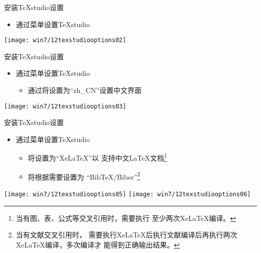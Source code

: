 \documentclass[fontset = none, t]{ctexbeamer}
\begin{document}
\begin{frame}{安装TeXstudio}{设置}
  \begin{spacing}{1.5}
    \begin{itemize}
    \item 通过菜单设置TeXstudio%
    \end{itemize}
    \begin{center}
      \texttt{[image: win7/12texstudiooptions02]}
    \end{center}
  \end{spacing}
\end{frame}

\begin{frame}{安装TeXstudio}{设置}
  \begin{spacing}{1.5}
    \begin{itemize}
    \item 通过菜单设置TeXstudio%
      \begin{itemize}
      \item 通过将设置为\enquote{zh\_CN}设置中文界面
      \end{itemize}
    \end{itemize}
    \begin{center}
      \texttt{[image: win7/12texstudiooptions03]}
    \end{center}
  \end{spacing}
\end{frame}

\begin{frame}{安装TeXstudio}{设置}
  \begin{spacing}{1.5}
    \begin{itemize}
    \item 通过菜单设置TeXstudio%
      \begin{itemize}
      \item 将设置为\alert{\enquote{XeLaTeX}}以
        支持中文\LaTeX 文档\footnote[frame,1]{当有图、表、公式等交叉引用时，需要执行
          至少两次XeLaTeX编译。}
      \item 将根据需要设置为
        \enquote{BibTeX/Biber}\footnote[frame,2]{当有文献交叉引用时，
          需要执行XeLaTeX后执行文献编译后再执行两次XeLaTeX编译，多次编译才
          能得到正确输出结果。}
      \end{itemize}
    \end{itemize}
    \begin{center}
      \texttt{[image: win7/12texstudiooptions05]}
      \texttt{[image: win7/12texstudiooptions06]}
    \end{center}
  \end{spacing}
\end{frame}
\end{document}
